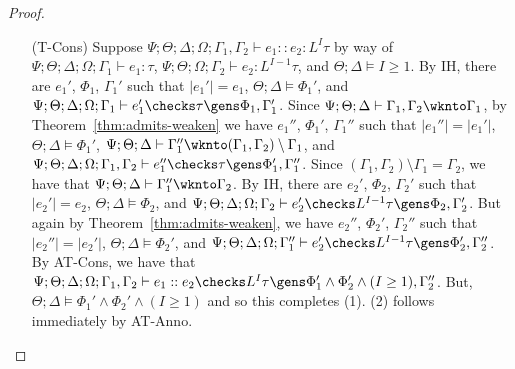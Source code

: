 \begin{proof}
\begin{itemize}
  \item[(T-Cons)] Suppose
  $\Psi ; \Theta ; \Delta ; \Omega ; \Gamma_1, \Gamma_2\vdash e_1 :: e_2 : L^I \tau$ by way of
  $\Psi ; \Theta ; \Delta ; \Omega ; \Gamma_1\vdash e_1 : \tau$,
  $\Psi ; \Theta ; \Omega ; \Gamma_2\vdash e_2 : L^{I-1} \tau$, and
  $\Theta ; \Delta \vDash I \geq 1$.
  By IH, there are $e_1'$, $\Phi_1$, $\Gamma_1'$ such that
  $|e_1'| = e_1$,
  $\Theta ; \Delta \vDash \Phi_1'$, and
  $\Psi ; \Theta ; \Delta ; \Omega ; \Gamma_1 \vdash e_1' \checks \tau \gens \Phi_1,\Gamma_1'$.
  Since $\Psi ; \Theta ; \Delta \vdash \Gamma_1,\Gamma_2 \wknto \Gamma_1$,
  by Theorem~\ref{thm:admits-weaken} we have $e_1''$, $\Phi_1'$, $\Gamma_1''$ such that
  $|e_1''| = |e_1'|$,
  $\Theta ; \Delta \vDash \Phi_1'$,
  $\Psi ; \Theta ; \Delta \vdash \Gamma_1'' \wknto (\Gamma_1,\Gamma_2) \setminus \Gamma_1$, and
  $\Psi ; \Theta ; \Delta ; \Omega ; \Gamma_1,\Gamma_2 \vdash e_1'' \checks \tau \gens \Phi_1',\Gamma_1''$.
  Since $(\Gamma_1,\Gamma_2) \setminus \Gamma_1 = \Gamma_2$,
  we have that
  $\Psi ; \Theta ; \Delta \vdash \Gamma_1'' \wknto \Gamma_2$.
  By IH, there are $e_2'$, $\Phi_2$, $\Gamma_2'$ such that
  $|e_2'| = e_2$,
  $\Theta ; \Delta \vDash \Phi_2$, and
  $\Psi ; \Theta ; \Delta ; \Omega ; \Gamma_2 \vdash e_2' \checks L^{I-1} \tau \gens \Phi_2,\Gamma_2'$.
  But again by Theorem~\ref{thm:admits-weaken}, we have $e_2''$, $\Phi_2'$, $\Gamma_2''$ such that
  $|e_2''| = |e_2'|$,
  $\Theta ; \Delta \vDash \Phi_2'$, and
  $\Psi ; \Theta ; \Delta ; \Omega ; \Gamma_1'' \vdash e_2' \checks L^{I-1} \tau \gens \Phi_2',\Gamma_2''$.
  By AT-Cons, we have that
  $\Psi ; \Theta ; \Delta ; \Omega ; \Gamma_1,\Gamma_2 \vdash e_1 :: e_2 \checks L^I \tau \gens \Phi_1' \wedge \Phi_2' \wedge (I \geq 1), \Gamma_2''$.
  But, $\Theta ; \Delta \vDash \Phi_1' \wedge \Phi_2' \wedge (I \geq 1)$ and so this completes (1). (2) follows immediately by AT-Anno.
  

\end{itemize}
\end{proof}
